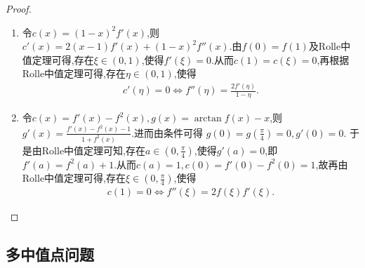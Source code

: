 \documentclass[../../main.tex]{subfiles}%
\begin{document}
\begin{proof}
\begin{enumerate}
\item 令\(c(x)=(1 - x)^2f'(x)\),则\(c'(x)=2(x - 1)f'(x)+(1 - x)^2f''(x)\).由\(f(0)=f(1)\)及Rolle中值定理可得,存在\(\xi\in(0,1)\),使得\(f'(\xi)=0\).从而\(c(1)=c(\xi)=0\),再根据Rolle中值定理可得,存在\(\eta\in(0,1)\),使得
\begin{align*}
c'(\eta)=0\Leftrightarrow f''(\eta)=\frac{2f'(\eta)}{1 - \eta}.
\end{align*} 

\item 令\(c(x)=f'(x)-f^{2}(x),g(x)=\arctan f(x)-x\),则\(g'(x)=\frac{f'(x)-f^{2}(x)-1}{1 + f^{2}(x)}\).进而由条件可得
\(g(0)=g(\frac{\pi}{4}) = 0,g'(0)=0\).
于是由Rolle中值定理可知,存在\(a\in(0,\frac{\pi}{4})\),使得\(g'(a)=0\),即\(f'(a)=f^{2}(a)+1\).从而\(c(a)=1,c(0)=f'(0)-f^{2}(0)=1\),故再由Rolle中值定理可得,存在\(\xi\in(0,\frac{\pi}{4})\),使得
\begin{align*}
c(1)=0\Leftrightarrow f''(\xi)=2f(\xi)f'(\xi).
\end{align*} 
\end{enumerate}

\end{proof}

\subsection{多中值点问题}
\end{document}
